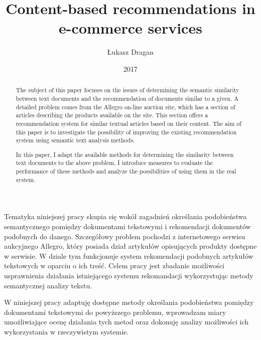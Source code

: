\documentclass[pl]{minipw} %
\title{Content-based recommendations in e-commerce services} %
\author{Łukasz Dragan}
\date{2017}
\begin{document}
\sloppy






\setcounter{page}{1}


\begin{streszczenie}

	Tematyka niniejszej pracy skupia się wokół zagadnień określania podobieństwa semantycznego pomiędzy dokumentami tekstowymi i rekomendacji dokumentów podobnych do danego. Szczegółowy problem pochodzi z internetowego serwisu aukcyjnego Allegro, który posiada dział artykułów opisujących produkty dostępne w serwisie. W dziale tym funkcjonuje system rekomendacji podobnych artykułów tekstowych w oparciu o ich treść. Celem pracy jest zbadanie możliwości usprawnienia działania istniejącego systemu rekomandacji wykorzystując metody semantycznej analizy tekstu.
	
	W niniejszej pracy adaptuję dostępne metody określania podobieństwa pomiędzy dokumentami tekstowymi do powyższego problemu, wprowadzam miary umożliwiające ocenę działania tych metod oraz dokonuję analizy możliwości ich wykorzystania w rzeczywistym systemie.
	
\end{streszczenie}


\begin{abstract}

	The subject of this paper focuses on the issues of determining the semantic similarity between text documents and the recommendation of documents similar to a given. A detailed problem comes from the Allegro on-line auction site, which has a section of articles describing the products available on the site. This section offers a recommendation system for similar textual articles based on their content. The aim of this paper is to investigate the possibility of improving the existing recommendation system using semantic text analysis methods.
	
	In this paper, I adapt the available methods for determining the similarity between text documents to the above problem, I introduce measures to evaluate the performance of these methods and analyze the possibilities of using them in the real system.
	
\end{abstract}
\end{document}
